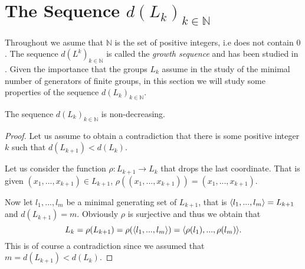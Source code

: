 \section{The Sequence \texorpdfstring{$d(L_k)_{k \in \mathbb{N}}$}{dLkN}}

Throughout we asume that $\mathbb{N}$ is the set of positive integers, i.e does not contain $0$.
The sequence $d(L^k)_{k \in \mathbb{N}}$ is called the \textit{growth sequence} and has been studied in \cite{WiegoldGSFG, WiegoldGSFGII, WiegoldGSFGIII, WiegoldGSFGIV}. Given the importance that the groups $L_k$ assume in the study of the minimal number of generators of finite groups, in this section we will study some properties of the sequence $d(L_k)_{k \in \mathbb{N}}$. 

\begin{theorem}
    \label{S2:nondecLk}
    The sequence $d(L_k)_{k \in \mathbb{N}}$ is non-decreasing.
\end{theorem}

\begin{proof}
    Let us assume to obtain a contradiction that there is some positive integer $k$ such that $d(L_{k+1}) < d(L_k)$. 
    
    Let us consider the function $\rho: L_{k+1} \rightarrow L_k$ that drops the last coordinate. That is given $(x_1,...,x_{k+1}) \in L_{k+1}$, $\rho((x_1,...,x_{k+1})) = (x_1,...,x_{k+1})$.

    Now let $l_1,...,l_m$ be a minimal generating set of $L_{k+1}$, that is $
    \langle l_1,...,l_m \rangle = L_{k+1}$ and $d(L_{k+1}) = m$.
    Obviously $\rho$ is surjective and thus we obtain that 
    $$
    L_k = \rho(L_{k+1}) = \rho(\langle l_1,...,l_m \rangle) = \langle \rho(l_1),...,\rho(l_m) \rangle.
    $$
    This is of course a contradiction since we assumed that $m = d(L_{k+1}) < d(L_k)$.
\end{proof}

